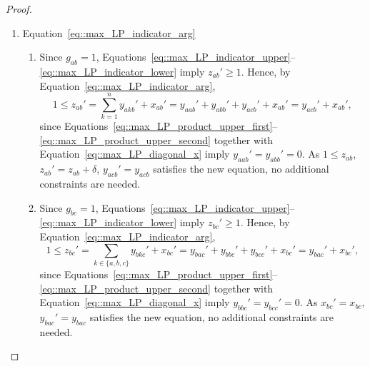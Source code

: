 \begin{proof}
\begin{enumerate}[label=\Alph*.]
\begin{enumerate}[label=(\roman*)]
\[          \]
          Since $x_{ba}'=x_{ab}'$ by Equation~\eqref{eq::max_LP_symmetry_x} and $x_{bc}'=x_{bc}$, it follows that
          \begin{equation} \label{eq::y_bcb_bab}
            y_{bab}'+y_{bcb}'= x_{ab}'+x_{bc}' 
          \end{equation}
          is an additional constraint that is needed.
        \item Since $g_{cc}=0$, Equations~\eqref{eq::max_LP_indicator_upper}--\eqref{eq::max_LP_indicator_lower} imply $z_{cc}'=0$. Therefore, as in above
          \[
          0 = \sum_{k\in\{a,b,c\}}y_{ckc}' -\sum_{k\in\{a,b,c\}}x_{ck}' = y_{cac}' + y_{cbc}' - x_{ca}' - x_{cb}'.
          \]
          Since $x_{cb}'=x_{bc}$ and $x_{ca}' = x_{ca}$ by Equation~\eqref{eq::max_LP_symmetry_x}, it follows that 
          \begin{equation} \label{eq::y_cac_cbc}
            y_{cac}' + y_{cbc}'= x_{ac}'+x_{bc}' 
          \end{equation}
          is an additional constraint that is needed.
      \end{enumerate}
    \item Equation~\eqref{eq::max_LP_indicator_arg}
      \begin{enumerate}[label=(\roman*)]
        \item Since $g_{ab}=1$, Equations~\eqref{eq::max_LP_indicator_upper}--\eqref{eq::max_LP_indicator_lower} imply $z_{ab}' \geq 1$. Hence, by Equation~\eqref{eq::max_LP_indicator_arg},
          \[
          1 \leq z_{ab}' = \sum_{k = 1}^{n}y_{akb}' + x_{ab}' = y_{aab}'+y_{abb}'+y_{acb}'+x_{ab}'=y_{acb}'+x_{ab}',
          \]
          since Equations~\eqref{eq::max_LP_product_upper_first}--\eqref{eq::max_LP_product_upper_second} together with Equation~\eqref{eq::max_LP_diagonal_x} imply $y_{aab}'=y_{abb}'=0$.  As $1 \leq z_{ab}$, $z_{ab}' = z_{ab} + \delta$, $y_{acb}' = y_{acb}$ satisfies the new equation, no additional constraints are needed. 
        \item  Since $g_{bc}=1$, Equations~\eqref{eq::max_LP_indicator_upper}--\eqref{eq::max_LP_indicator_lower} imply $z_{bc}' \geq 1$. Hence, by Equation~\eqref{eq::max_LP_indicator_arg},
          \[
          1 \leq z_{bc}' = \sum_{k\in\{a,b,c\}}y_{bkc}'+x_{bc}' =y_{bac}'+y_{bbc}'+y_{bcc}'+x_{bc}'=y_{bac}'+x_{bc}',
          \]
          since Equations~\eqref{eq::max_LP_product_upper_first}--\eqref{eq::max_LP_product_upper_second} together with Equation~\eqref{eq::max_LP_diagonal_x} imply $y_{bbc}'=y_{bcc}'=0$. As $x_{bc}'=x_{bc}$, $y_{bac}' = y_{bac}$ satisfies the new equation, no additional constraints are needed. 

\end{enumerate}
\end{enumerate}
\end{proof}
